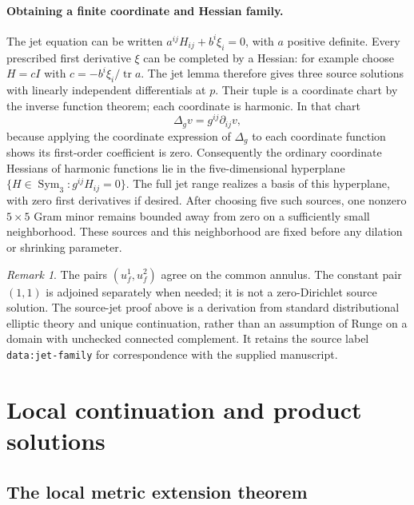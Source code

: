 \documentclass[11pt]{article}
\theoremstyle{definition}
\theoremstyle{remark}
\newtheorem{remark}[theorem]{Remark}
\numberwithin{equation}{section}
\begin{document}
\paragraph{Obtaining a finite coordinate and Hessian family.}
The jet equation can be written $a^{ij}H_{ij}+b^i\xi_i=0$, with
$a$ positive definite. Every prescribed first derivative $\xi$
can be completed by a Hessian: for example choose $H=cI$ with
$c=-b^i\xi_i/\operatorname{tr}a$. The jet lemma therefore gives
three source solutions with linearly independent differentials at
$p$. Their tuple is a coordinate chart by the inverse function theorem;
each coordinate is harmonic. In that chart
\[
 \Delta_g v=g^{ij}\partial_{ij}v,
\]
because applying the coordinate expression of $\Delta_g$ to each
coordinate function shows its first-order coefficient is zero.
Consequently the ordinary coordinate Hessians of harmonic functions
lie in the five-dimensional hyperplane
$\{H\in\operatorname{Sym}_3:g^{ij}H_{ij}=0\}$.
The full jet range realizes a basis of this hyperplane, with zero
first derivatives if desired. After choosing five such sources,
one nonzero $5\times5$ Gram minor remains bounded away from zero
on a sufficiently small neighborhood. These sources and this
neighborhood are fixed before any dilation or shrinking parameter.

\begin{remark}\label{data:local-pairs}
The pairs $(u_f^1,u_f^2)$ agree on the common annulus. The constant
pair $(1,1)$ is adjoined separately when needed; it is not a
zero-Dirichlet source solution. The source-jet proof above is a
derivation from standard distributional elliptic theory and unique
continuation, rather than an assumption of Runge on a domain with
unchecked connected complement. It retains the source label
\texttt{data:jet-family} for correspondence with the supplied manuscript.
\end{remark}

\section{Local continuation and product solutions}
\label{cross:section}

\subsection{The local metric extension theorem}
\end{document}
